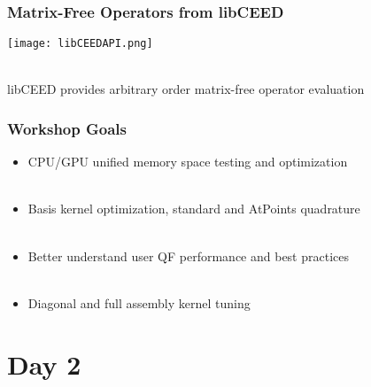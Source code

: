 \documentclass{beamer}
\begin{document}

\begin{frame}
\begin{center}
\frametitle{Matrix-Free Operators from libCEED}

\texttt{[image: libCEEDAPI.png]}

~\\

libCEED provides arbitrary order matrix-free operator evaluation\\

\end{center}
\end{frame}


\begin{frame}
\begin{center}
\frametitle{Workshop Goals}

\begin{itemize}

\item CPU/GPU unified memory space testing and optimization\\

~\\

\item Basis kernel optimization, standard and AtPoints quadrature\\

~\\

\item Better understand user QF performance and best practices\\

~\\

\item Diagonal and full assembly kernel tuning\\

\end{itemize}

\end{center}
\end{frame}

\section{Day 2}
\end{document}
